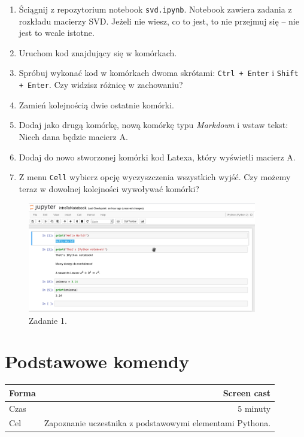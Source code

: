 \documentclass{mwart}
\begin{document}
\begin{enumerate}
  \item Ściągnij z repozytorium notebook \texttt{svd.ipynb}. Notebook zawiera zadania z
    rozkładu macierzy SVD. Jeżeli nie wiesz, co to jest, to nie przejmuj się
    -- nie jest to wcale istotne.
  \item Uruchom kod znajdujący się w komórkach.
  \item Spróbuj wykonać kod w komórkach dwoma skrótami: \texttt{Ctrl + Enter} i
    \texttt{Shift + Enter}. Czy widzisz różnicę w zachowaniu?
  \item Zamień kolejnością dwie ostatnie komórki.
  \item Dodaj jako drugą komórkę, nową komórkę typu \emph{Markdown} i wstaw tekst:
    Niech dana będzie macierz A.
  \item Dodaj do nowo stworzonej komórki kod Latexa, który wyświetli macierz A.
  \item Z menu \texttt{Cell} wybierz opcję wyczyszczenia wszystkich wyjść. Czy możemy
    teraz w dowolnej kolejności wywoływać komórki?
\end{enumerate}

\begin{center}
  \begin{figure}
    \includegraphics[width=10cm]{zad1}
    \caption{Zadanie 1.}
  \end{figure}
\end{center}

\section{Podstawowe komendy}

\begin{center}
  \begin{tabular}{lr}
    \toprule
    Forma & Screen cast \\
    \midrule
    Czas & 5 minuty \\
    Cel & Zapoznanie uczestnika z podstawowymi elementami Pythona. \\
    \bottomrule
  \end{tabular}
\end{center}
\end{document}
